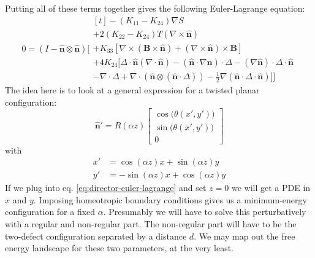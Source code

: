 \documentclass[reqno]{article}
\newcommand{\n}{\hat{\mathbf{n}}}
\begin{document}
Putting all of these terms together gives the following Euler-Lagrange equation:
\begin{equation} \label{eq:director-euler-lagrange}
    0
    =
    \left(I - \n \otimes \n \right)
    \biggl[
        \begin{multlined}[t]
        - \left(K_{11} - K_{24}\right) \nabla S \\
        + 2 \left(K_{22} - K_{24}\right) T \left(\nabla \times \n \right) \\
        + K_{33} \left[ 
            \nabla \times \left(\mathbf{B} \times \n \right)
            + \left( \nabla \times \n \right) \times \mathbf{B}
        \right] \\
        + 4 K_{24} \bigl[
            \Delta \cdot \n \left(\nabla \cdot \n\right)
            - \left( \n \cdot \nabla \n \right) \cdot \Delta
            - \left( \nabla \n \right) \cdot \Delta \cdot \n \\
            - \nabla \cdot \Delta
            + \nabla \cdot \left(\n \otimes \left(\n \cdot \Delta\right) \right)
            - \tfrac12 \nabla \left( \n \cdot \Delta \cdot \n \right)
        \bigr]
    \biggr]
    \end{multlined}
\end{equation}
The idea here is to look at a general expression for a twisted planar configuration:
\begin{equation}
    \n'
    =
    R (\alpha z)
    \begin{bmatrix}
        \cos\bigl(\theta(x', y')\bigr) \\
        \sin\bigl(\theta(x', y')\bigr) \\
        0
    \end{bmatrix}
\end{equation}
with
\begin{equation}
\begin{split}
    x' 
    &= 
    \cos(\alpha z) x + \sin(\alpha z) y \\
    y'
    &=
    -\sin(\alpha z) x + \cos(\alpha z) y
\end{split}
\end{equation}
If we plug into eq. \eqref{eq:director-euler-lagrange} and set $z = 0$ we will get a PDE in $x$ and $y$.
Imposing homeotropic boundary conditions gives us a minimum-energy configuration for a fixed $\alpha$.
Presumably we will have to solve this perturbatively with a regular and non-regular part.
The non-regular part will have to be the two-defect configuration separated by a distance $d$.
We may map out the free energy landscape for these two parameters, at the very least. 
\end{document}
